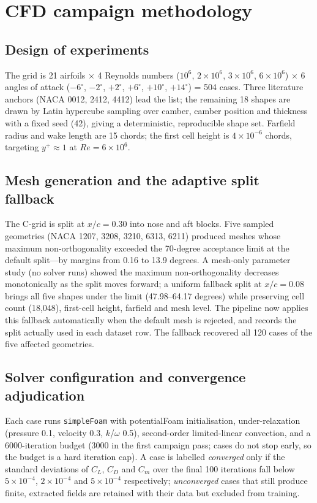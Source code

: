 \documentclass[11pt,a4paper]{article}
\begin{document}
\section{CFD campaign methodology}

\subsection{Design of experiments}

The grid is 21 airfoils $\times$ 4 Reynolds numbers
($10^6$, $2\times10^6$, $3\times10^6$, $6\times10^6$) $\times$ 6 angles of
attack ($-6^\circ$, $-2^\circ$, $+2^\circ$, $+6^\circ$, $+10^\circ$,
$+14^\circ$) = 504 cases. Three literature anchors (NACA 0012, 2412, 4412)
lead the list; the remaining 18 shapes are drawn by Latin hypercube sampling
over camber, camber position and thickness with a fixed seed (42), giving a
deterministic, reproducible shape set. Farfield radius and wake length are 15
chords; the first cell height is $4\times10^{-6}$ chords, targeting
$y^+ \approx 1$ at $Re = 6\times10^6$.

\subsection{Mesh generation and the adaptive split fallback}

The C-grid is split at $x/c = 0.30$ into nose and aft blocks. Five sampled
geometries (NACA 1207, 3208, 3210, 6313, 6211) produced meshes whose maximum
non-orthogonality exceeded the 70-degree acceptance limit at the default
split---by margins from 0.16 to 13.9 degrees. A mesh-only parameter study
(no solver runs) showed the maximum non-orthogonality decreases monotonically
as the split moves forward; a uniform fallback split at $x/c = 0.08$ brings
all five shapes under the limit (47.98--64.17 degrees) while preserving cell
count (18{,}048), first-cell height, farfield and mesh level. The pipeline now
applies this fallback automatically when the default mesh is rejected, and
records the split actually used in each dataset row. The fallback recovered
all 120 cases of the five affected geometries.

\subsection{Solver configuration and convergence adjudication}

Each case runs \texttt{simpleFoam} with potentialFoam initialisation,
under-relaxation (pressure 0.1, velocity 0.3, $k$/$\omega$ 0.5), second-order
limited-linear convection, and a 6000-iteration budget (3000 in the first
campaign pass; cases do not stop early, so the budget is a hard iteration
cap). A case is labelled \emph{converged} only if the standard deviations of
$C_L$, $C_D$ and $C_m$ over the final 100 iterations fall below
$5\times10^{-4}$, $2\times10^{-4}$ and $5\times10^{-4}$ respectively;
\emph{unconverged} cases that still produce finite, extracted fields are
retained with their data but excluded from training.
\end{document}
